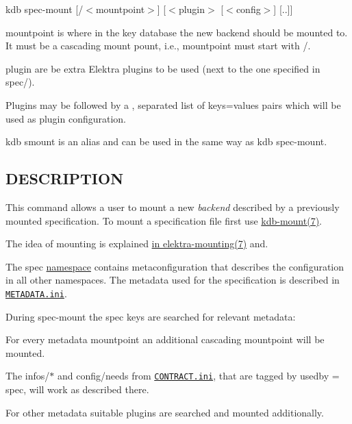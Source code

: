 {\ttfamily kdb spec-\/mount \mbox{[}/$<$mountpoint$>$\mbox{]} \mbox{[}$<$plugin$>$ \mbox{[}$<$config$>$\mbox{]} \mbox{[}..\mbox{]}\mbox{]}}


\begin{DoxyItemize}
\item {\ttfamily mountpoint} is where in the key database the new backend should be mounted to. It must be a cascading mount pount, i.\+e., {\ttfamily mountpoint} must start with {\ttfamily /}.
\item {\ttfamily plugin} are be extra Elektra plugins to be used (next to the one specified in {\ttfamily spec/}).
\item Plugins may be followed by a {\ttfamily ,} separated list of {\ttfamily keys=values} pairs which will be used as plugin configuration.
\end{DoxyItemize}

{\ttfamily kdb smount} is an alias and can be used in the same way as {\ttfamily kdb spec-\/mount}.

\subsection*{D\+E\+S\+C\+R\+I\+P\+T\+I\+O\+N}

This command allows a user to mount a new {\itshape backend} described by a previously mounted specification. To mount a specification file first use \hyperlink{md_doc_help_kdb-mount_doc_help_kdb-mount_md}{kdb-\/mount(7)}.

The idea of mounting is explained \hyperlink{md_doc_help_elektra-mounting_doc_help_elektra-mounting_md}{in elektra-\/mounting(7)} and.

The {\ttfamily spec} \hyperlink{md_doc_help_elektra-namespaces_doc_help_elektra-namespaces_md}{namespace} contains metaconfiguration that describes the configuration in all other namespaces. The metadata used for the specification is described in \href{/home/markus/Projekte/Elektra/current/doc/METADATA.ini}{\tt M\+E\+T\+A\+D\+A\+T\+A.\+ini}.

During {\ttfamily spec-\/mount} the {\ttfamily spec} keys are searched for relevant metadata\+:


\begin{DoxyItemize}
\item For every metadata {\ttfamily mountpoint} an additional cascading mountpoint will be mounted.
\item The {\ttfamily infos/$\ast$} and {\ttfamily config/needs} from \href{/home/markus/Projekte/Elektra/current/doc/CONTRACT.ini}{\tt C\+O\+N\+T\+R\+A\+C\+T.\+ini}, that are tagged by {\ttfamily usedby = spec}, will work as described there.
\item For other metadata suitable plugins are searched and mounted additionally.
\end{DoxyItemize}

